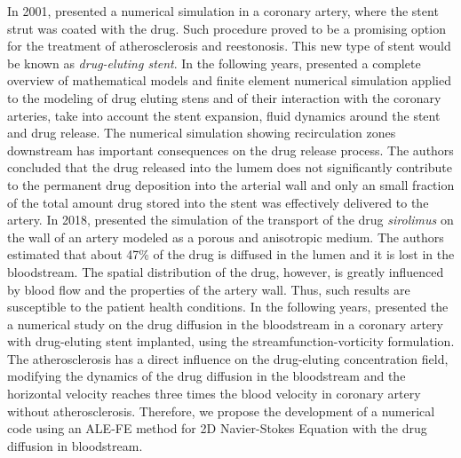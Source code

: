 \documentclass[10pt,fleqn,a4paper,twoside]{article}
\begin{document}
\smallskip
In 2001,
\citeauthor{hwang2001} presented
a numerical simulation in a coronary artery, 
where the stent strut 
was coated with the drug.
Such procedure proved to be a promising option
for the treatment of atherosclerosis and reestonosis.
This new type of stent
would be known as \textit{drug-eluting stent}.
In the following years,
\cite{zunino2009} presented 
a complete overview
of mathematical models and finite element numerical simulation
applied to the  modeling of drug eluting stens and
of their interaction with
the coronary arteries, take into account the stent expansion,
fluid dynamics around the stent and drug release. The numerical
simulation showing recirculation zones downstream
has important consequences on the drug release process.
The authors concluded that the drug released into the lumem
does not significantly contribute to the permanent drug
deposition into the arterial wall and only an small fraction of
the total amount drug stored into the stent was effectively
delivered to the artery.
In 2018, \citeauthor{lucena2018} presented
the simulation of the transport of the drug \textit{sirolimus}
 on the wall of an artery modeled as a porous and anisotropic medium.
 The authors estimated that
 about 47\% of the drug is diffused in the lumen and it is lost in
 the bloodstream. The spatial distribution of the drug, however,
 is greatly influenced by blood flow and the properties of
the artery wall. Thus, such results are susceptible to the
 patient health conditions.
In the following years,
\cite{marques2021} presented the
a numerical study on the drug diffusion in the bloodstream
in a coronary artery with drug-eluting stent implanted,
using the streamfunction-vorticity formulation.
The atherosclerosis has a direct influence
on the drug-eluting concentration field, 
modifying the dynamics of the drug diffusion in
the bloodstream and the horizontal velocity reaches
three times the blood velocity in coronary artery 
without atherosclerosis.
Therefore, we propose the development of a numerical code 
using an ALE-FE method for 2D Navier-Stokes Equation
with the drug diffusion in bloodstream.
\end{document}
